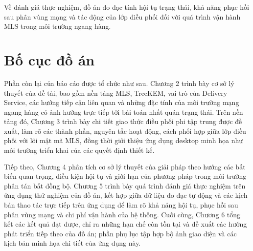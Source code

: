 \documentclass[../DoAn.tex]{subfiles}
\begin{document}
Về đánh giá thực nghiệm, đồ án đo đạc tính hội tụ trạng thái, khả năng phục hồi sau phân vùng mạng và tác động của lớp điều phối đối với quá trình vận hành MLS trong môi trường ngang hàng.

\section{Bố cục đồ án}
\label{sec:bo-cuc}

Phần còn lại của báo cáo được tổ chức như sau. Chương 2 trình bày cơ sở lý thuyết của đề tài, bao gồm nền tảng MLS, TreeKEM, vai trò của Delivery Service, các hướng tiếp cận liên quan và những đặc tính của môi trường mạng ngang hàng có ảnh hưởng trực tiếp tới bài toán nhất quán trạng thái. Trên nền tảng đó, Chương 3 trình bày chi tiết giao thức điều phối phi tập trung được đề xuất, làm rõ các thành phần, nguyên tắc hoạt động, cách phối hợp giữa lớp điều phối với lõi mật mã MLS, đồng thời giới thiệu ứng dụng desktop minh họa như môi trường triển khai của các quyết định thiết kế.

Tiếp theo, Chương 4 phân tích cơ sở lý thuyết của giải pháp theo hướng các bất biến quan trọng, điều kiện hội tụ và giới hạn của phương pháp trong môi trường phân tán bất đồng bộ. Chương 5 trình bày quá trình đánh giá thực nghiệm trên ứng dụng thử nghiệm của đồ án, kết hợp giữa dữ liệu đo đạc tự động và các kịch bản thao tác trực tiếp trên ứng dụng để làm rõ khả năng hội tụ, phục hồi sau phân vùng mạng và chi phí vận hành của hệ thống. Cuối cùng, Chương 6 tổng kết các kết quả đạt được, chỉ ra những hạn chế còn tồn tại và đề xuất các hướng phát triển tiếp theo của đồ án; phần phụ lục tập hợp bộ ảnh giao diện và các kịch bản minh họa chi tiết của ứng dụng này.
\end{document}
